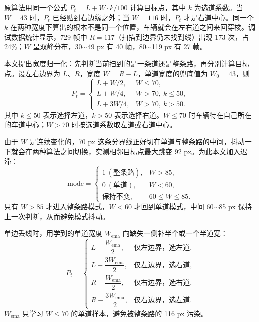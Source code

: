 \documentclass{MaiTechReport}
\begin{document}
原算法用同一个公式 $P_t=L+W\cdot k/100$ 计算目标点，其中 $k$ 为选道系数。当 $W=43$ 时，$P_t$ 已经贴到右边缘之外；当 $W=116$ 时，$P_t$ 才是右道中心。同一个 $k$ 在两种宽度下算出的根本不是同一个位置，车辆就会在左右道之间来回穿梭。调试数据统计显示，729 帧中 $R=117$（扫描到边界仍未找到线）出现 173 次，占 24\%；$W$ 呈双峰分布，30$\sim$49 px 有 40 帧，80$\sim$119 px 有 27 帧。

本文提出宽度归一化：先判断当前扫到的是一条道还是整条路，再分别计算目标点。设左右边界为 $L$、$R$，宽度 $W=R-L$，单道宽度的兜底值为 $W_0=43$，则
\begin{equation}
  P_t=
  \begin{cases}
    L+W/2, & W\le 70,\\[2pt]
    L+W/4, & W>70,\ k\le 50,\\[2pt]
    L+3W/4, & W>70,\ k>50.
  \end{cases}
  \label{eq:target}
\end{equation}
其中 $k\le 50$ 表示选择左道，$k>50$ 表示选择右道。$W\le 70$ 时车辆待在自己所在的车道中心；$W>70$ 时按选道系数取左道或右道中心。

由于 $W$ 是连续变化的，70 px 这条分界线正好切在单道与整条路的中间，抖动一下就会在两种算法之间切换，实测相邻目标点最大跳变 92 px。为此本文加入迟滞：
\begin{equation}
  \text{mode}=
  \begin{cases}
    1\ (\text{整条路}), & W>85,\\
    0\ (\text{单道}), & W<60,\\
    \text{保持不变}, & 60\le W\le 85.
  \end{cases}
  \label{eq:hysteresis}
\end{equation}
只有 $W>85$ 才进入整条路模式，$W<60$ 才回到单道模式，中间 60$\sim$85 px 保持上一次判断，从而避免模式抖动。

单边丢线时，用学到的单道宽度 $W_{\mathrm{ema}}$ 向缺失一侧补半个或一个半道宽：
\begin{equation}
  P_t=
  \begin{cases}
    L+\dfrac{W_{\mathrm{ema}}}{2}, & \text{仅左边界，选左道},\\[6pt]
    L+\dfrac{3W_{\mathrm{ema}}}{2}, & \text{仅左边界，选右道},\\[6pt]
    R-\dfrac{W_{\mathrm{ema}}}{2}, & \text{仅右边界，选右道},\\[6pt]
    R-\dfrac{3W_{\mathrm{ema}}}{2}, & \text{仅右边界，选左道}.
  \end{cases}
  \label{eq:single}
\end{equation}
$W_{\mathrm{ema}}$ 只学习 $W\le 70$ 的单道样本，避免被整条路的 116 px 污染。
\end{document}
